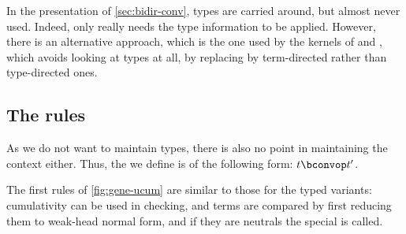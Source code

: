 In the presentation of \cref{sec:bidir-conv}, types are carried around,
but almost never used. Indeed,
only  really needs the type information to be applied.
However, there is an alternative approach, which is the one used by the kernels of 
and , which avoids looking at types at all, by replacing 
by term-directed rather than type-directed ones.

\subsection{The rules}

As we do not want to maintain types, there is also no point in maintaining the context either.
Thus, the  we define is of the following form: $\buconv{\gamma}{t}{t'}$.

\begin{figure*}[h]
  \ContinuedFloat*
  \caption{Untyped cumulativity and conversion}
  \label{fig:gene-ucum}
\end{figure*}

The first rules of \cref{fig:gene-ucum} are similar to those for the typed variants: cumulativity can be used
in checking, and terms are compared by first reducing them to weak-head normal form, and if they are neutrals
the special  is called.

